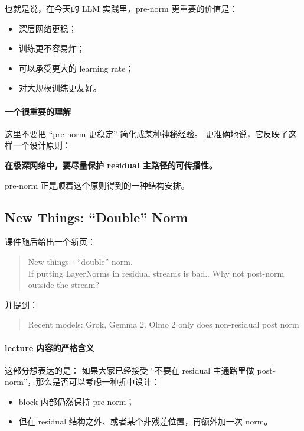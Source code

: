 \documentclass[a4paper,UTF8]{article}
\numberwithin{equation}{section}
\begin{document}
也就是说，在今天的 LLM 实践里，pre-norm 更重要的价值是：

\begin{itemize}
    \item 深层网络更稳；
    \item 训练更不容易炸；
    \item 可以承受更大的 learning rate；
    \item 对大规模训练更友好。
\end{itemize}

\paragraph{一个很重要的理解}
这里不要把 ``pre-norm 更稳定'' 简化成某种神秘经验。  
更准确地说，它反映了这样一个设计原则：

\begin{center}
\textbf{在极深网络中，要尽量保护 residual 主路径的可传播性。}
\end{center}

pre-norm 正是顺着这个原则得到的一种结构安排。

\subsection{New Things: ``Double'' Norm}

课件随后给出一个新页：
\begin{quote}
New things - ``double'' norm. \\
If putting LayerNorms in residual streams is bad.. Why not post-norm outside the stream?
\end{quote}

并提到：
\begin{quote}
Recent models: Grok, Gemma 2. Olmo 2 only does non-residual post norm
\end{quote}

\paragraph{lecture 内容的严格含义}
这部分想表达的是：  
如果大家已经接受 ``不要在 residual 主通路里做 post-norm''，那么是否可以考虑一种折中设计：

\begin{itemize}
    \item block 内部仍然保持 pre-norm；
    \item 但在 residual 结构之外、或者某个非残差位置，再额外加一次 norm。
\end{itemize}
\end{document}
